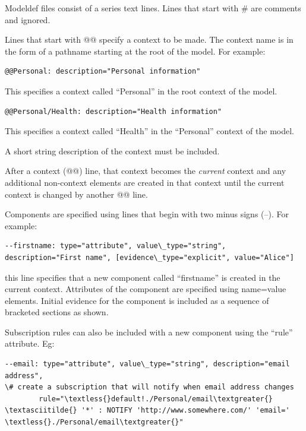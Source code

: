 \documentclass[letterpaper,10pt,english]{sphinxmanual}
\begin{document}
Modeldef files consist of a series text lines. Lines that start with \# are comments and ignored.

Lines that start with @@ specify a context to be made. The context name is in the form of a pathname starting
at the root of the model. For example:

\begin{Verbatim}[commandchars=\\\{\}]
@@Personal: description="Personal information"
\end{Verbatim}

This specifies a context called ``Personal'' in the root context of the model.

\begin{Verbatim}[commandchars=\\\{\}]
@@Personal/Health: description="Health information"
\end{Verbatim}

This specifies a context called ``Health'' in the ``Personal'' context of the model.

A short string description of the context must be included.

After a context (@@) line, that context becomes the \emph{current} context and any additional non-context elements
are created in that context until the current context is changed by another @@ line.

Components are specified using lines that begin with two minus signs (--). For example:

\begin{Verbatim}[commandchars=\\\{\}]
--firstname: type="attribute", value\_type="string", description="First name", [evidence\_type="explicit", value="Alice"]
\end{Verbatim}

this line specifies that a new component called ``firstname'' is created in the current context.
Attributes of the component are specified using name=value elements.
Initial evidence for the component is included as a sequence of bracketed sections as shown.

Subscription rules can also be included with a new component using the ``rule'' attribute. Eg:

\begin{Verbatim}[commandchars=\\\{\}]
--email: type="attribute", value\_type="string", description="email address",
\# create a subscription that will notify when email address changes
        rule="\textless{}default!./Personal/email\textgreater{} \textasciitilde{} '*' : NOTIFY 'http://www.somewhere.com/' 'email=' \textless{}./Personal/email\textgreater{}"
\end{Verbatim}
\end{document}
